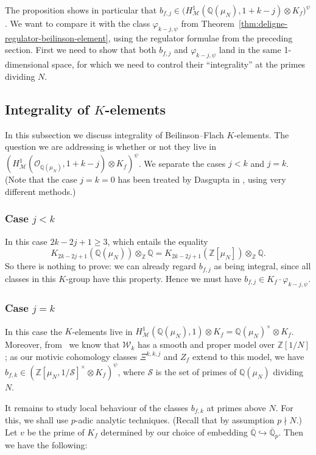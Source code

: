 \documentclass[11pt, a4paper, reqno]{amsart}
\theoremstyle{definition}
\theoremstyle{plain}
\theoremstyle{remark}
\DeclareMathOperator{\mot}{\mathscr{M}}
\newcommand{\numberset}{\mathbb}
\newcommand{\Q}{\numberset{Q}}
\newcommand{\Z}{\numberset{Z}}
\renewcommand{\phi}{\varphi}
\newcommand{\ringint}{\mathcal}
\newcommand{\KS}{\mathscr{W}}
\newcommand{\ups}{\mathcal{S}}
\renewcommand{\ge}{\geqslant}
\renewcommand{\geq}{\ge}
\begin{document}
  The proposition shows in particular that $b_{f, j} \in \bigl(H^1_{\mot}(\Q(\mu_N),1+k-j)\otimes K_f\bigr)^{\psi}$. We want to compare it with the class $\phi_{k-j, \psi}$ from Theorem~\ref{thm:deligne-regulator-beilinson-element}, using the regulator formulae from the preceding section. First we need to show that both $b_{f, j}$ and $\phi_{k-j,\psi}$ land in the same 1-dimensional space, for which we need to control their ``integrality'' at the primes dividing $N$.

 \subsection{Integrality of \texorpdfstring{$K$}{K}-elements}
 \label{subsec:integrality}

  In this subsection we discuss integrality of Beilinson--Flach $K$-elements. The question we are addressing is whether or not they live in $(H_{\mot}^1(\ringint{O}_{\Q(\mu_N)},1+k-j) \otimes K_f)^{\psi}$. We separate the cases $j < k$ and $j=k$. (Note that the case $j = k = 0$ has been treated by Dasgupta in \cite{Dasgupta-factorization}, using very different methods.)

  \subsubsection*{Case $j<k$}
  In this case $2k-2j+1 \geq 3$, which entails the equality
  \[
   K_{2k-2j+1}(\Q(\mu_N))\otimes_{\Z} \Q = K_{2k-2j+1}(\Z[\mu_N])\otimes_{\Z} \Q.
  \]
  So there is nothing to prove: we can already regard $b_{f, j}$ as being integral, since all classes in this $K$-group have this property. Hence we must have $b_{f, j} \in K_f \cdot \varphi_{k - j, \psi}$.

  \subsubsection*{Case $j=k$}

  In this case the $K$-elements live in $H^1_{\mot}(\Q(\mu_N),1)\otimes K_f = \Q(\mu_N)^{\times} \otimes K_f$. Moreover, from~\cite[Remark~4.2.1]{scholl90} we know that $\KS_k$ has a smooth and proper model over $\Z[1/N]$; as our motivic cohomology classes $\Xi^{k, k, j}$ and $Z_f$ extend to this model, we have $b_{f, k} \in (\Z[\mu_N, 1/\ups]^\times \otimes K_f)^{\psi}$, where $\ups$ is the set of primes of $\Q(\mu_N)$ dividing $N$.

  It remains to study local behaviour of the classes $b_{f, k}$ at primes above $N$. For this, we shall use $p$-adic analytic techniques. (Recall that by assumption $p \nmid N$.) Let $v$ be the prime of $K_f$ determined by our choice of embedding $\overline{\Q} \hookrightarrow \overline{\Q}_p$. Then we have the following:
\end{document}
